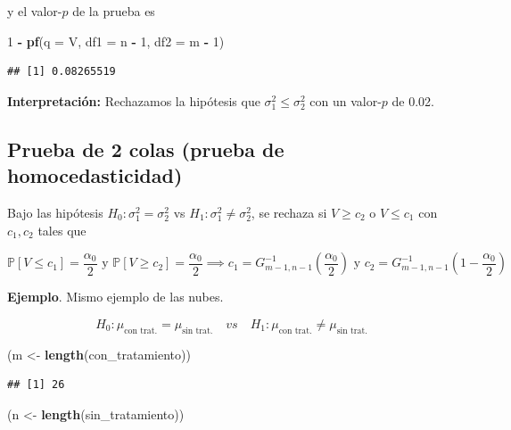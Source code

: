 \documentclass[
  12pt,
]{book}
\newenvironment{Shaded}{\begin{snugshade}}{\end{snugshade}}
\newcommand{\DataTypeTok}[1]{\textcolor[rgb]{0.13,0.29,0.53}{#1}}
\newcommand{\DecValTok}[1]{\textcolor[rgb]{0.00,0.00,0.81}{#1}}
\newcommand{\KeywordTok}[1]{\textcolor[rgb]{0.13,0.29,0.53}{\textbf{#1}}}
\newcommand{\NormalTok}[1]{#1}
\newcommand{\OperatorTok}[1]{\textcolor[rgb]{0.81,0.36,0.00}{\textbf{#1}}}
\newcommand{\StringTok}[1]{\textcolor[rgb]{0.31,0.60,0.02}{#1}}
\begin{document}
y el valor-\(p\) de la prueba es

\begin{Shaded}
\begin{Highlighting}[]
\DecValTok{1} \OperatorTok{{-}}\StringTok{ }\KeywordTok{pf}\NormalTok{(}\DataTypeTok{q =}\NormalTok{ V, }\DataTypeTok{df1 =}\NormalTok{ n }\OperatorTok{{-}}\StringTok{ }\DecValTok{1}\NormalTok{, }\DataTypeTok{df2 =}\NormalTok{ m }\OperatorTok{{-}}\StringTok{ }\DecValTok{1}\NormalTok{)}
\end{Highlighting}
\end{Shaded}

\begin{verbatim}
## [1] 0.08265519
\end{verbatim}

\textbf{Interpretación:} Rechazamos la hipótesis que \(\sigma_{1}^{2} \leq \sigma_{2}^{2}\) con un valor-\(p\) de 0.02.

\hypertarget{prueba-de-2-colas-prueba-de-homocedasticidad}{%
\subsection{Prueba de 2 colas (prueba de homocedasticidad)}\label{prueba-de-2-colas-prueba-de-homocedasticidad}}

Bajo las hipótesis \(H_0: \sigma^2_1=\sigma^2_2\) vs
\(H_1: \sigma^2_1\ne\sigma^2_2\), se rechaza si \(V\geq c_2\) o \(V\leq c_1\) con
\(c_1,c_2\) tales que

\[\mathbb P[V\leq c_1] = \dfrac{\alpha_0}{2} \text{ y } \mathbb P[V\geq c_2] =
\dfrac{\alpha_0}{2} \implies c_1 =
G_{m-1,n-1}^{-1}\left(\dfrac{\alpha_0}{2}\right) \text{ y } c_2 =
G_{m-1,n-1}^{-1}\left(1-\dfrac{\alpha_0}{2}\right)\]

\textbf{Ejemplo}. Mismo ejemplo de las nubes.

\[
H_0: \mu_{\text{con trat.}} = \mu_{\text{sin trat.}} \quad
vs \quad
H_1: \mu_{\text{con trat.}} \neq \mu_{\text{sin trat.}} 
\]

\begin{Shaded}
\begin{Highlighting}[]
\NormalTok{(m \textless{}{-}}\StringTok{ }\KeywordTok{length}\NormalTok{(con\_tratamiento))}
\end{Highlighting}
\end{Shaded}

\begin{verbatim}
## [1] 26
\end{verbatim}

\begin{Shaded}
\begin{Highlighting}[]
\NormalTok{(n \textless{}{-}}\StringTok{ }\KeywordTok{length}\NormalTok{(sin\_tratamiento))}
\end{Highlighting}
\end{Shaded}
\end{document}
